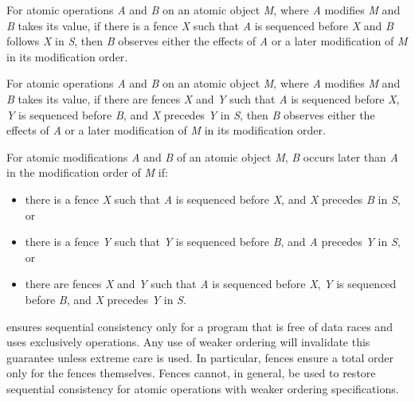 \pnum
For atomic operations \textit{A} and \textit{B} on an atomic object \textit{M}, where
\textit{A} modifies \textit{M} and \textit{B} takes its value, if there is a
 fence \textit{X} such that \textit{A} is sequenced before
\textit{X} and \textit{B} follows \textit{X} in \textit{S}, then \textit{B} observes
either the effects of \textit{A} or a later modification of \textit{M} in its
modification order.

\pnum
For atomic operations \textit{A} and \textit{B} on an atomic object \textit{M}, where
\textit{A} modifies \textit{M} and \textit{B} takes its value, if there are
 fences \textit{X} and \textit{Y} such that \textit{A} is
sequenced before \textit{X}, \textit{Y} is sequenced before \textit{B}, and \textit{X}
precedes \textit{Y} in \textit{S}, then \textit{B} observes either the effects of
\textit{A} or a later modification of \textit{M} in its modification order.

\pnum
For atomic modifications \textit{A} and \textit{B} of an atomic object \textit{M},
\textit{B} occurs later than \textit{A} in the modification order of \textit{M} if:

\begin{itemize}
\item there is a  fence \textit{X} such that \textit{A}
is sequenced before \textit{X}, and \textit{X} precedes \textit{B} in \textit{S}, or
\item there is a  fence \textit{Y} such that \textit{Y}
is sequenced before \textit{B}, and \textit{A} precedes \textit{Y} in \textit{S}, or
\item there are  fences \textit{X} and \textit{Y} such that \textit{A}
is sequenced before \textit{X}, \textit{Y} is sequenced before \textit{B},
and \textit{X} precedes \textit{Y} in \textit{S}.
\end{itemize}


\pnum
\begin{note}  ensures sequential consistency only for a
program that is free of data races and uses exclusively 
operations. Any use of weaker ordering will invalidate this guarantee unless extreme
care is used. In particular,  fences ensure a total order
only for the fences themselves. Fences cannot, in general, be used to restore sequential
consistency for atomic operations with weaker ordering specifications. \end{note}

